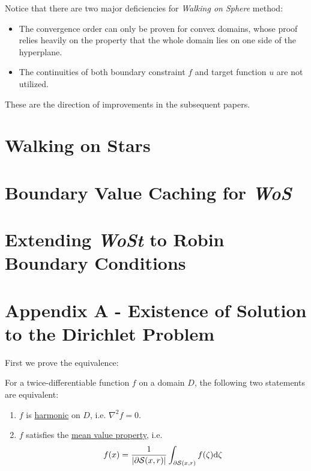 \documentclass[10pt]{article}
\begin{document}
\begin{remark}
    Notice that there are two major deficiencies for \emph{Walking on Sphere} method:
    \begin{itemize}
        \item The convergence order can only be proven for convex domains, whose proof relies heavily on the property that the whole domain lies on one side of the hyperplane.
        \item The continuities of both boundary constraint $f$ and target function $u$ are not utilized.
    \end{itemize}
    These are the direction of improvements in the subsequent papers.
\end{remark}

\section{Walking on Stars \cite{WalkOnStars}}

\section{Boundary Value Caching for \emph{WoS} \cite{BVCWoS}}

\section{Extending \emph{WoSt} to Robin Boundary Conditions\cite{WalkinRobin}}

\printbibliography

\section{Appendix A - Existence of Solution to the Dirichlet Problem}\label{appendix A}

First we prove the equivalence:

\begin{proposition}
    For a twice-differentiable function $f$ on a domain $D$, the following two statements are equivalent:
    \begin{enumerate}
        \item $f$ is \hyperref[def: harmonic function]{harmonic} on $D$, i.e. $\nabla^2 f = 0$.
        \item $f$ satisfies the \hyperref[def: mean value property]{mean value property}, i.e.
        \[
            f(x) = \frac{1}{\left|\partial \mathcal{S}(x, r)\right|}\int_{\partial \mathcal{S}(x, r)} f(\zeta) \mathrm{d} \zeta
        \]
    \end{enumerate}
\end{proposition}
\end{document}
